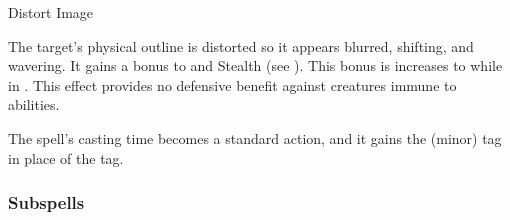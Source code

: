 \newpage
\begin{spellsection}{Distort Image}

\begin{spellcontent}

\begin{spelltargetinginfo}



\end{spelltargetinginfo}


\begin{spelleffects}



\spelleffect
The target's physical outline is distorted so it appears blurred, shifting, and wavering.
It gains a  bonus to  and Stealth (see ).
This bonus is increases to  while in .
This effect provides no defensive benefit against creatures immune to  abilities.








\end{spelleffects}

\end{spellcontent}
\begin{spellfooter}


\end{spellfooter}
\begin{spellsubcontent}


\begin{spellcantrip}
The spell's casting time becomes a standard action, and it gains the  (minor) tag in place of the  tag.
\end{spellcantrip}


\end{spellsubcontent}
\end{spellsection}


\subsubsection{Subspells}





